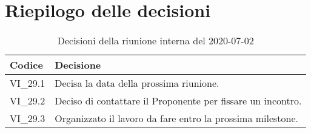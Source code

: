 \section{Riepilogo delle decisioni}
\begin{longtable}{ 
	 >{\centering}p{} >{}p{} }
	
	\caption{Decisioni della riunione interna del 2020-07-02}\\	
	
	\textbf{\color{white}Codice} & 
	\textbf{\color{white}Decisione} 
	\tabularnewline  
	\endhead
	
	VI\_29.1 & Decisa la data della prossima riunione. \\
	VI\_29.2 & Deciso di contattare il Proponente\ped{\textit{G}} per fissare un incontro. \\
	VI\_29.3 & Organizzato il lavoro da fare entro la prossima milestone. \\
\end{longtable}
